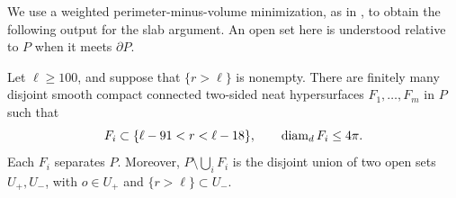 We use a weighted perimeter-minus-volume minimization, as in
\cite[Proposition~12]{ChodoshLi2024}, to obtain the following output for
the slab argument.  An open set here is understood relative to $P$ when
it meets $\partial P$.

\begin{proposition}\label{prop:separating-interfaces}
Let $\ell\ge100$, and suppose that $\{r>\ell\}$ is nonempty.  There are finitely
many disjoint smooth compact connected two-sided neat hypersurfaces
$F_1,\ldots,F_m$ in $P$ such that
\begin{equation}\label{eq:interface-location}
 F_i\subset\{\ell-91<r<\ell-18\},\qquad \operatorname{diam}_d F_i\le4\pi.
\end{equation}
Each $F_i$ separates $P$.  Moreover,
$P\setminus\bigcup_iF_i$ is the disjoint union of two open sets
$U_+,U_-$, with $o\in U_+$ and $\{r>\ell\}\subset U_-$.
\end{proposition}

